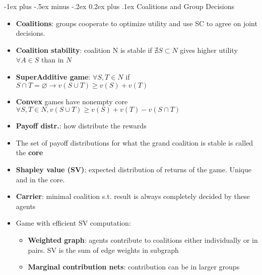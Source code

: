 \documentclass[10pt,a4paper,landscape]{article}
\makeatletter
\renewcommand{\section}{\@startsection{section}{1}{0mm}%
                                {-1ex plus -.5ex minus -.2ex}%
                                {0.2ex plus .1ex}%
                                {\normalfont\tiny\bfseries}}
\makeatother
\begin{document}
\begin{multicols*}{5}
\section{Coalitions and Group Decisions}
\begin{itemize}
	\item \textbf{Coalitions}: groups cooperate to optimize utility and use SC to agree on joint decisions.
	\item \textbf{Coalition stability}: coalition N is stable if $ \nexists S \subset N$ gives higher utility $\forall A \in S$ than in $N$
	\item \textbf{SuperAdditive game}: 
	$\forall S,T \in N$ if $S \cap T = \varnothing \rightarrow v(S \cup T) \geq v(S) + v(T)$
	\item \textbf{Convex} games have nonempty core\\
	$\forall S,T \in N, v(S \cup T) \geq v(S) + v(T) - v(S \cap T)$
	\item \textbf{Payoff distr.}: how distribute the rewards
	\item The set of payoff distributions for what the grand coalition is stable is called the \textbf{core} 
	\item \textbf{Shapley value (SV)}: expected distribution of returns of the game. Unique and in the core. 
	\item \textbf{Carrier}: minimal coalition s.t. result is always completely decided by these agents
	\item Game with efficient SV computation:
	\begin{itemize}
		\item \textbf{Weighted graph}: agents contribute to coalitions either individually or in pairs. SV is the sum of edge weights in subgraph
		\item \textbf{Marginal contribution nets}: contribution can be in larger groups
	\end{itemize}
	
\end{itemize}

\end{multicols*}
\end{document}
